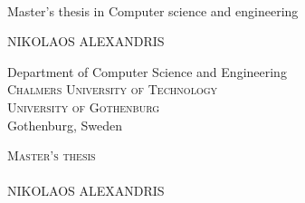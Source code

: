 
{ %


\begin{titlepage}
			
\addtolength{\voffset}{2cm}

\begin{figure}[H]
\centering
\vspace{1cm}	%
\end{figure}

\mbox{}
\vfill
\renewcommand{\familydefault}{\sfdefault} \normalfont %

\textbf{\Huge \multiLineTitle{0.2cm}} 
\\[0.5cm]



Master's thesis in Computer science and engineering \setlength{\parskip}{1cm}

{\Large NIKOLAOS ALEXANDRIS} \setlength{\parskip}{2.9cm}

Department of Computer Science and Engineering \\
\textsc{Chalmers University of Technology} \\
\textsc{University of Gothenburg} \\
Gothenburg, Sweden \the\year

\renewcommand{\familydefault}{\rmdefault} \normalfont %
\end{titlepage}


\newpage
\restoregeometry
\thispagestyle{empty}
\mbox{}


\newpage
\thispagestyle{empty}
\begin{center}
	\textsc{\large Master's thesis \the\year}\\[4cm]		%
	\textbf{\Large \multiLineTitle{0.2cm}} \\[1cm]
	{\large NIKOLAOS ALEXANDRIS}
	

\end{center}}
